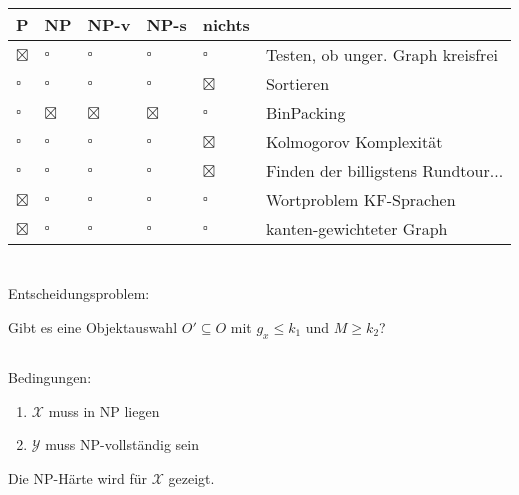 \documentclass{article}
\begin{document}
\section{}
\begin{center}
\begin{tabularx}{\textwidth}{lllll|X}
P & NP & NP-v & NP-s & nichts & \\
\hline
$\boxtimes$ & $\square$ & $\square$ & $\square$ & $\square$ & Testen, ob unger. Graph kreisfrei \\
$\square$ & $\square$ & $\square$ & $\square$ & $\boxtimes$ & Sortieren\\
$\square$ & $\boxtimes$ & $\boxtimes$ & $\boxtimes$ & $\square$ & BinPacking\\
$\square$ & $\square$ & $\square$ & $\square$ & $\boxtimes$ & Kolmogorov Komplexität\\
$\square$ & $\square$ & $\square$ & $\square$ & $\boxtimes$ & Finden der billigstens Rundtour...\\
$\boxtimes$ & $\square$ & $\square$ & $\square$ & $\square$ & Wortproblem KF-Sprachen \\
$\boxtimes$ & $\square$ & $\square$ & $\square$ & $\square$ & kanten-gewichteter Graph \\
\end{tabularx}
\end{center}

\section{}
\subsection{}
Entscheidungsproblem:

Gibt es eine Objektauswahl $O'\subseteq O$ mit $g_x \leq k_1$ und $M \geq k_2$?

\subsection{}
Bedingungen:
\begin{enumerate}
  \item $\mathcal{X}$ muss in NP liegen
	\item $\mathcal{Y}$ muss NP-vollständig sein
\end{enumerate}
Die NP-Härte wird für $\mathcal{X}$ gezeigt.
\end{document}
